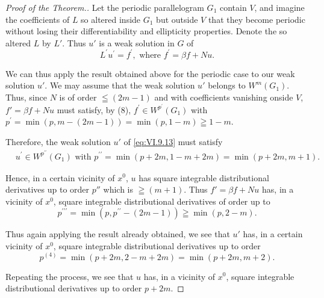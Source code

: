 \begin{proof}[Proof of the Theorem.]
Let the periodic parallelogram $G_{1}$ contain $V$, and imagine the coefficients of $L$ so altered inside $G_{1}$ but outside $V$ that they become periodic without losing their differentiability and ellipticity properties. Denote the so altered $L$ by $L'$. Thus $u'$ is a weak solution in $G$ of 
\begin{equation}\label{eq:VI.9.13}
L ^{\prime} u ^{\prime} = f ^{\prime}, \text{ where } f ^{\prime} = \beta f + N u.
\end{equation}

We can thus apply the result obtained above for the periodic case to our weak solution $u'$. We may assume that the weak solution $u'$ belongs to $W^{m}(G_{1})$. Thus, since $N$ is of order $\leqq(2m-1)$ and with coefficients vanishing onside $V$, $f'=\beta f+Nu$ must satisfy, by ($8$), 
$f^{\prime}\in W^{p^{\prime}}(G_{1})$ with $p^{\prime} = \min (p,m - (2m - 1)) = \min (p,1 - m)\geqq 1 - m.$ 

Therefore, the weak solution $u'$ of \eqref{eq:VI.9.13} must satisfy 
\[
\begin{aligned}
&u ^{\prime} \in W ^ {p ^{\prime \prime}} (G _{1})  \text{ with } p ^{\prime \prime} = \min (p + 2 m, 1 - m + 2 m) = \min (p + 2 m, m + 1).
\end{aligned}
\]

Hence, in a certain vicinity of $x^0$, $u$ has square integrable distributional derivatives up to order $p''$ which is $\geqq (m + 1)$. Thus $f' = \beta f + Nu$ has, in a vicinity of $x^0$, square integrable distributional derivatives of order up to 
\[
p ^{\prime \prime \prime} = \min (p, p ^{\prime \prime} - (2 m - 1)) \geqq \min (p, 2 - m).
\]

Thus again applying the result already obtained, we see that $u'$ has, in a certain vicinity of $x^{0}$, square integrable distributional derivatives up to order 
\[
p ^{(4)} = \min (p + 2 m, 2 - m + 2 m) = \min (p + 2 m, m + 2).
\]

Repeating the process, we see that $u$ has, in a vicinity of $x^{0}$, square integrable distributional derivatives up to order $p + 2m$. 
\end{proof}


\label{sec:VI.10}

